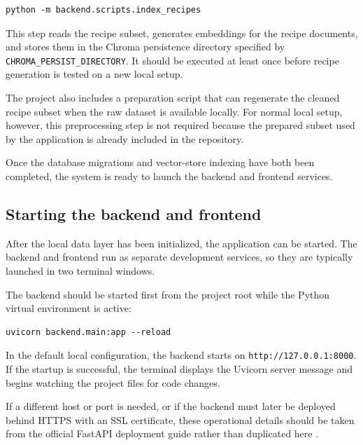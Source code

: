 \begin{lstlisting}
python -m backend.scripts.index_recipes
\end{lstlisting}

This step reads the recipe subset, generates embeddings for the recipe
documents, and stores them in the Chroma persistence directory
specified by \texttt{CHROMA\_PERSIST\_DIRECTORY}. It should be executed
at least once before recipe generation is tested on a new local setup.

The project also includes a preparation script that can regenerate the
cleaned recipe subset when the raw dataset is available locally. For
normal local setup, however, this preprocessing step is not required
because the prepared subset used by the application is already
included in the repository.

Once the database migrations and vector-store indexing have both been
completed, the system is ready to launch the backend and frontend
services.

\subsection{Starting the backend and frontend}

After the local data layer has been initialized, the application can
be started. The backend and frontend run as separate development
services, so they are typically launched in two terminal windows.

The backend should be started first from the project root while the
Python virtual environment is active:

\begin{lstlisting}
uvicorn backend.main:app --reload
\end{lstlisting}

In the default local configuration, the backend starts on
\texttt{http://127.0.0.1:8000}. If the startup is successful, the
terminal displays the Uvicorn server message and begins watching the
project files for code changes.

If a different host or port is needed, or if the backend must later be
deployed behind HTTPS with an SSL certificate, these operational details
should be taken from the official FastAPI deployment guide rather than
duplicated here \cite{fastapi2026deployment}.

